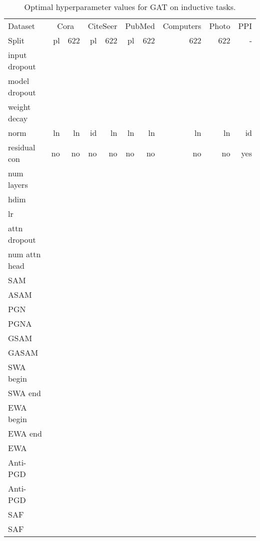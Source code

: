 \documentclass[runningheads]{llncs}
\begin{document}
\begin{table*}[!ht]
    \centering  
        \caption{Optimal hyperparameter values for GAT on inductive tasks.}
    \label{tab:gat_params_ind}
    \tiny
    \begin{tabular}{l|r r | r r | r r | r | r | r }\toprule
    Dataset       & \multicolumn{2}{c|}{Cora} & \multicolumn{2}{c|}{CiteSeer} & \multicolumn{2}{c|}{PubMed} & Computers & Photo & PPI\\
    Split         & pl & 622 & pl & 622 & pl & 622 & 622 & 622 & -\\ \midrule
    input dropout &  &  &  &  &  &  &  &  &  \\
    model dropout &  &  &  &  &  &  &  &  &  \\
    weight decay  &  &  &  &  &  &  &  &  &  \\
    norm          & ln & ln & id & ln & ln & ln & ln & ln & id \\
    residual con           & no & no & no & no & no & no & no & no & yes \\
    num layers    &   &   &   &   &   &  &  &  &   \\
    hdim          &  &  &  &  &  &  &  &  &  \\
    lr            & & & & & & &  &  & \\
    attn dropout  &  &  &  &  &  &  &  &  &   \\
    num attn head &    &  &  &  &  &  &  &  &  \\ \midrule
    SAM     &    &  &  &  &  &  &  &  &  \\
    ASAM    &&  &  &  &  &  &  &  &  \\
    PGN   &  &  &  &  &  &  &  &  &  \\
    PGNA  &  &  &  &  &  &  &  &  &  \\
    GSAM  &  &&  &  &  &  &  &  &  \\
    GASAM &&  &  &  &  &  &  &  &  \\
    SWA begin     &   &  &  &  &  &  &  &  &  \\
    SWA end       &  &  &  &  &  &  &  &  &  \\
    EWA begin     &    &  &  &  &  &  &  &  &   \\
    EWA end       &    &  &  &  &  &  &  &  &  \\
    EWA   &  &  &  &  &  &  &  &  &  \\
    Anti-PGD &&&  &  &  &  &  &  &  \\
    Anti-PGD   &  &  &  &  &  &  &  &  &  \\
    SAF  &  &  &  &  &  &  &  &  &  \\
    SAF     &  &  &  &  &  &  &  &  & \\
    \bottomrule
    \end{tabular}

\end{table*}
\end{document}
